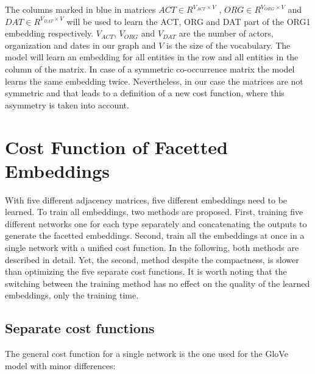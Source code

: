 The columns marked in blue in matrices $ACT\in R^{V_{ACT}\times V}$ , $ORG\in R^{V_{ORG}\times V}$  and $DAT\in R^{V_{DAT}\times V}$ will be used to learn the ACT, ORG and DAT part of the ORG1 embedding respectively. $V_{ACT}$, $V_{ORG}$ and $V_{DAT}$ are the number of actors, organization and dates in our graph and $V$ is the size of the vocabulary. The model will learn an embedding for all entities in the row and all entities in the column of the matrix. In case of a symmetric co-occurrence matrix the model learns the same embedding twice. Nevertheless, in our case the matrices are not symmetric and that leads to a definition of a new cost function, where this asymmetry is taken into account.  
\section{Cost Function of Facetted Embeddings}
\label{sec:facetted_embeddings}

With five different adjacency matrices, five different embeddings need to be learned. To train all embeddings, two methods are proposed. First, training five different networks one for each type separately and concatenating the outputs to generate the facetted embeddings. Second, train all the embeddings at once in a single network with a unified cost function. In the following, both methods are described in detail. Yet, the second, method despite the compactness, is slower than optimizing the five separate cost functions. It is worth noting that the switching between the training method has no effect on the quality of the learned embeddings, only the training time.\\
\subsection{Separate cost functions}
\label{sec:normal_cost}

The general cost function for a single network is the one used for the GloVe model with minor differences: 

